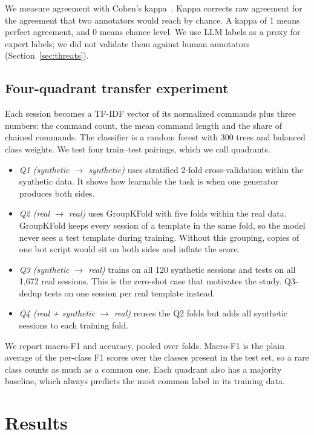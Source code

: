 \documentclass[conference]{IEEEtran}
\begin{document}
We measure agreement with Cohen's kappa~\cite{cohen1960kappa}. Kappa corrects raw agreement for the agreement that two annotators would reach by chance. A kappa of 1 means perfect agreement, and 0 means chance level. We use LLM labels as a proxy for expert labels; we did not validate them against human annotators (Section~\ref{sec:threats}).

\subsection{Four-quadrant transfer experiment}
Each session becomes a TF-IDF vector of its normalized commands plus three numbers: the command count, the mean command length and the share of chained commands. The classifier is a random forest with 300 trees and balanced class weights. We test four train--test pairings, which we call quadrants.
\begin{itemize}
\item \emph{Q1 (synthetic $\to$ synthetic)} uses stratified 2-fold cross-validation within the synthetic data. It shows how learnable the task is when one generator produces both sides.
\item \emph{Q2 (real $\to$ real)} uses GroupKFold with five folds within the real data. GroupKFold keeps every session of a template in the same fold, so the model never sees a test template during training. Without this grouping, copies of one bot script would sit on both sides and inflate the score.
\item \emph{Q3 (synthetic $\to$ real)} trains on all 120 synthetic sessions and tests on all 1,672 real sessions. This is the zero-shot case that motivates the study. Q3-dedup tests on one session per real template instead.
\item \emph{Q4 (real + synthetic $\to$ real)} reuses the Q2 folds but adds all synthetic sessions to each training fold.
\end{itemize}

We report macro-F1 and accuracy, pooled over folds. Macro-F1 is the plain average of the per-class F1 scores over the classes present in the test set, so a rare class counts as much as a common one. Each quadrant also has a majority baseline, which always predicts the most common label in its training data.

\section{Results}\label{sec:results}
\end{document}
